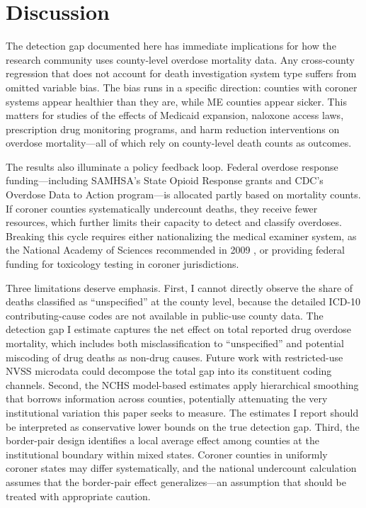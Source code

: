 \documentclass[12pt]{article}
\begin{document}
\section{Discussion}

The detection gap documented here has immediate implications for how the research community uses county-level overdose mortality data. Any cross-county regression that does not account for death investigation system type suffers from omitted variable bias. The bias runs in a specific direction: counties with coroner systems appear healthier than they are, while ME counties appear sicker. This matters for studies of the effects of Medicaid expansion, naloxone access laws, prescription drug monitoring programs, and harm reduction interventions on overdose mortality---all of which rely on county-level death counts as outcomes.

The results also illuminate a policy feedback loop. Federal overdose response funding---including SAMHSA's State Opioid Response grants and CDC's Overdose Data to Action program---is allocated partly based on mortality counts. If coroner counties systematically undercount deaths, they receive fewer resources, which further limits their capacity to detect and classify overdoses. Breaking this cycle requires either nationalizing the medical examiner system, as the National Academy of Sciences recommended in 2009 \citep{nrc2009strengthening}, or providing federal funding for toxicology testing in coroner jurisdictions.

Three limitations deserve emphasis. First, I cannot directly observe the share of deaths classified as ``unspecified'' at the county level, because the detailed ICD-10 contributing-cause codes are not available in public-use county data. The detection gap I estimate captures the net effect on total reported drug overdose mortality, which includes both misclassification to ``unspecified'' and potential miscoding of drug deaths as non-drug causes. Future work with restricted-use NVSS microdata could decompose the total gap into its constituent coding channels. Second, the NCHS model-based estimates apply hierarchical smoothing that borrows information across counties, potentially attenuating the very institutional variation this paper seeks to measure. The estimates I report should be interpreted as conservative lower bounds on the true detection gap. Third, the border-pair design identifies a local average effect among counties at the institutional boundary within mixed states. Coroner counties in uniformly coroner states may differ systematically, and the national undercount calculation assumes that the border-pair effect generalizes---an assumption that should be treated with appropriate caution.
\end{document}
